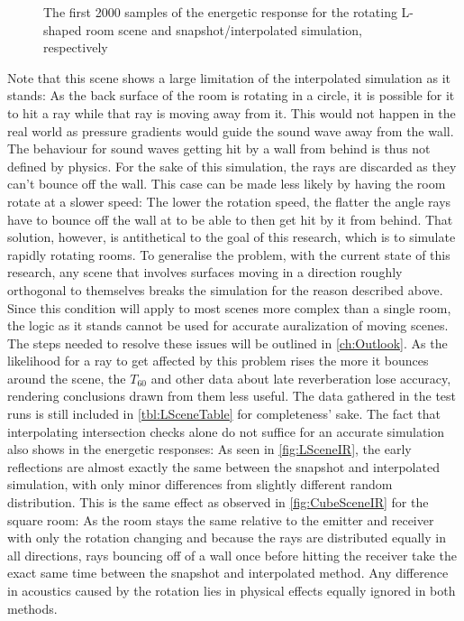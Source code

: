 \begin{figure}[t!]
    \begin{center}
        
    \end{center}
    \caption{The first 2000 samples of the energetic response for the rotating L-shaped room scene and snapshot/interpolated simulation, respectively}\label{fig:LSceneIR}
\end{figure}

Note that this scene shows a large limitation of the interpolated simulation as it stands:
As the back surface of the room is rotating in a circle,
it is possible for it to hit a ray while that ray is moving away from it.
This would not happen in the real world as pressure gradients would guide the sound wave away from the wall.
\newline
The behaviour for sound waves getting hit by a wall from behind is thus not defined by physics.
For the sake of this simulation, the rays are discarded as they can't bounce off the wall.
This case can be made less likely by having the room rotate at a slower speed:
The lower the rotation speed, the flatter the angle rays have to bounce off the wall at to be able to then get hit by it from behind.
That solution, however, is antithetical to the goal of this research, which is to simulate rapidly rotating rooms.
\newline
To generalise the problem, with the current state of this research,
any scene that involves surfaces moving in a direction roughly orthogonal to themselves breaks the simulation for the reason described above.
Since this condition will apply to most scenes more complex than a single room,
the logic as it stands cannot be used for accurate auralization of moving scenes.
The steps needed to resolve these issues will be outlined in \autoref{ch:Outlook}.
\newline
As the likelihood for a ray to get affected by this problem rises the more it bounces around the scene,
the \(T_{60}\) and other data about late reverberation lose accuracy,
rendering conclusions drawn from them less useful.
The data gathered in the test runs is still included in \autoref{tbl:LSceneTable} for completeness' sake.
\newline
The fact that interpolating intersection checks alone do not suffice for an accurate simulation also shows in the energetic responses:
As seen in \autoref{fig:LSceneIR}, the early reflections are almost exactly the same between the snapshot and interpolated simulation,
with only minor differences from slightly different random distribution.
This is the same effect as observed in \autoref{fig:CubeSceneIR} for the square room:
As the room stays the same relative to the emitter and receiver with only the rotation changing
and because the rays are distributed equally in all directions,
rays bouncing off of a wall once before hitting the receiver take the exact same time between the snapshot and interpolated method.
Any difference in acoustics caused by the rotation lies in physical effects equally ignored in both methods.

